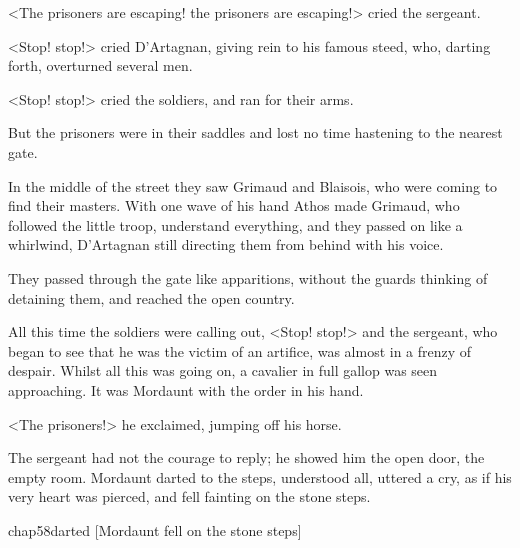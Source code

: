 <The prisoners are escaping! the prisoners are escaping!> cried the sergeant.

<Stop! stop!> cried D'Artagnan, giving rein to his famous steed, who, darting forth, overturned several men.

<Stop! stop!> cried the soldiers, and ran for their arms.

But the prisoners were in their saddles and lost no time hastening to the nearest gate.

In the middle of the street they saw Grimaud and Blaisois, who were coming to find their masters. With one wave of his hand Athos made Grimaud, who followed the little troop, understand everything, and they passed on like a whirlwind, D'Artagnan still directing them from behind with his voice.

They passed through the gate like apparitions, without the guards thinking of detaining them, and reached the open country.

All this time the soldiers were calling out, <Stop! stop!> and the sergeant, who began to see that he was the victim of an artifice, was almost in a frenzy of despair. Whilst all this was going on, a cavalier in full gallop was seen approaching. It was Mordaunt with the order in his hand.

<The prisoners!> he exclaimed, jumping off his horse.

The sergeant had not the courage to reply; he showed him the open door, the empty room. Mordaunt darted to the steps, understood all, uttered a cry, as if his very heart was pierced, and fell fainting on the stone steps. 

\begin{bwbigpic}
	[\basicscale] 
	{chap58darted}
	[Mordaunt fell on the stone steps]
\end{bwbigpic}